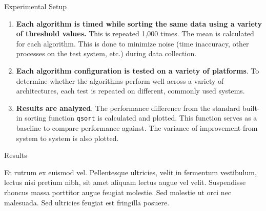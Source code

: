 \documentclass[final]{beamer}
\newlength{\colwidth}
\begin{document}
\begin{frame}[t]
\begin{columns}[t]
\begin{column}{\colwidth}
\begin{block}{Experimental Setup}
				\begin{enumerate}
					\item \textbf{Each algorithm is timed while sorting the same data using a variety of threshold values.} This is repeated 1,000 times. The mean is calculated for each
					      algorithm. This is done to minimize noise (time
					      inaccuracy, other processes on the test system, etc.)
					      during data collection.
					\item \textbf{Each algorithm configuration is tested on a
						      variety of platforms}. To determine whether the
					      algorithms perform well across a variety of
					      architectures, each test is repeated on different,
					      commonly used systems.
					\item \textbf{Results are analyzed}. The performance
					      difference from the standard built-in sorting function
					      \texttt{qsort} is calculated and plotted. This function
					      serves as a baseline to compare performance against. The
					      variance of improvement from system to system is also
					      plotted.
				\end{enumerate}
			\end{block}

			\begin{block}{Results}

				Et rutrum ex euismod vel. Pellentesque ultricies, velit in fermentum
				vestibulum, lectus nisi pretium nibh, sit amet aliquam lectus augue vel
				velit. Suspendisse rhoncus massa porttitor augue feugiat molestie. Sed
				molestie ut orci nec malesuada. Sed ultricies feugiat est fringilla
				posuere.


\end{block}
\end{column}
\end{columns}
\end{frame}
\end{document}
